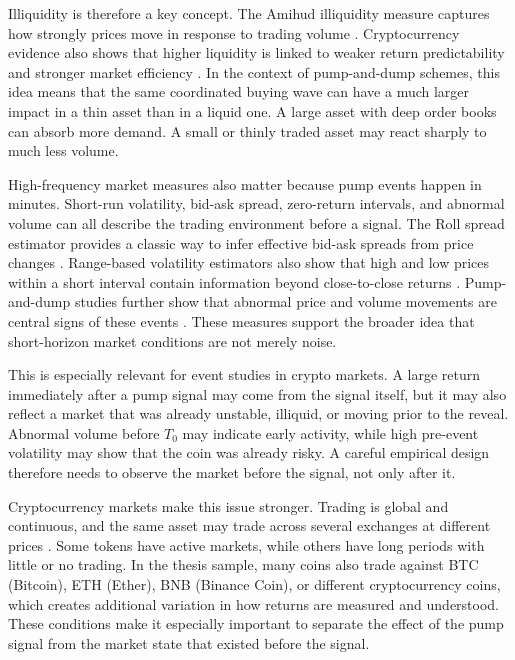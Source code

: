 Illiquidity is therefore a key concept. The Amihud illiquidity measure captures how strongly prices move in response to trading volume \cite{amihud2002illiquidity}. Cryptocurrency evidence also shows that higher liquidity is linked to weaker return predictability and stronger market efficiency \cite{wei2018liquidity}. In the context of pump-and-dump schemes, this idea means that the same coordinated buying wave can have a much larger impact in a thin asset than in a liquid one. A large asset with deep order books can absorb more demand. A small or thinly traded asset may react sharply to much less volume.

High-frequency market measures also matter because pump events happen in minutes. Short-run volatility, bid-ask spread, zero-return intervals, and abnormal volume can all describe the trading environment before a signal. The Roll spread estimator provides a classic way to infer effective bid-ask spreads from price changes \cite{roll1984simple}. Range-based volatility estimators also show that high and low prices within a short interval contain information beyond close-to-close returns \cite{parkinson1980extreme}. Pump-and-dump studies further show that abnormal price and volume movements are central signs of these events \cite{kamps2018pump, li2021cryptocurrency}. These measures support the broader idea that short-horizon market conditions are not merely noise.

This is especially relevant for event studies in crypto markets. A large return immediately after a pump signal may come from the signal itself, but it may also reflect a market that was already unstable, illiquid, or moving prior to the reveal. Abnormal volume before $T_0$ may indicate early activity, while high pre-event volatility may show that the coin was already risky. A careful empirical design therefore needs to observe the market before the signal, not only after it.

Cryptocurrency markets make this issue stronger. Trading is global and continuous, and the same asset may trade across several exchanges at different prices \cite{makarov2020trading}. Some tokens have active markets, while others have long periods with little or no trading. In the thesis sample, many coins also trade against BTC (Bitcoin), ETH (Ether), BNB (Binance Coin), or different cryptocurrency coins, which creates additional variation in how returns are measured and understood. These conditions make it especially important to separate the effect of the pump signal from the market state that existed before the signal.

